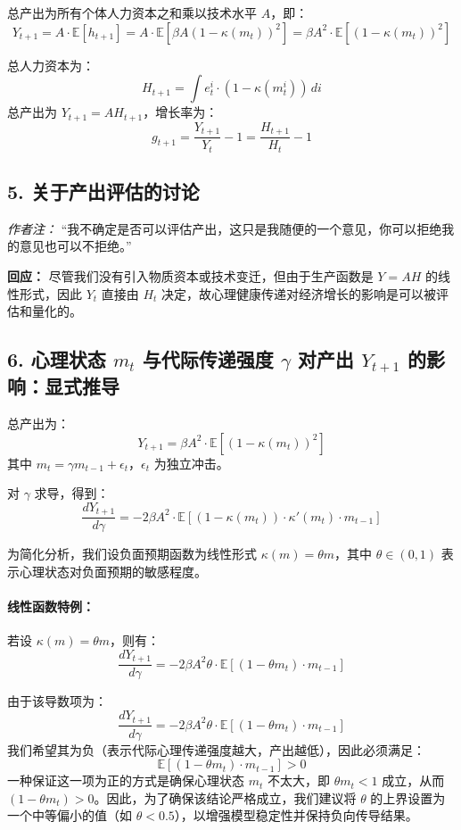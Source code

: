 \documentclass[12pt]{article}
\begin{document}
总产出为所有个体人力资本之和乘以技术水平 $A$，即：
\[
Y_{t+1} = A \cdot \mathbb{E}[h_{t+1}] = A \cdot \mathbb{E}[\beta A (1 - \kappa(m_t))^2] = \beta A^2 \cdot \mathbb{E}[(1 - \kappa(m_t))^2]
\]

总人力资本为：
\[
H_{t+1} = \int e_t^i \cdot (1 - \kappa(m_t^i)) \, di
\]
总产出为 $Y_{t+1} = A H_{t+1}$，增长率为：
\[
g_{t+1} = \frac{Y_{t+1}}{Y_t} - 1 = \frac{H_{t+1}}{H_t} - 1
\]

\subsection*{5. 关于产出评估的讨论}

\textit{作者注：} “我不确定是否可以评估产出，这只是我随便的一个意见，你可以拒绝我的意见也可以不拒绝。”

\textbf{回应：} 尽管我们没有引入物质资本或技术变迁，但由于生产函数是 $Y = A H$ 的线性形式，因此 $Y_t$ 直接由 $H_t$ 决定，故心理健康传递对经济增长的影响是可以被评估和量化的。

\subsection*{6. 心理状态 $m_t$ 与代际传递强度 $\gamma$ 对产出 $Y_{t+1}$ 的影响：显式推导}

总产出为：
\[
Y_{t+1} = \beta A^2 \cdot \mathbb{E}\left[(1 - \kappa(m_t))^2\right]
\]
其中 $m_t = \gamma m_{t-1} + \epsilon_t$，$\epsilon_t$ 为独立冲击。

对 $\gamma$ 求导，得到：
\[
\frac{dY_{t+1}}{d\gamma} = -2 \beta A^2 \cdot \mathbb{E}\left[
(1 - \kappa(m_t)) \cdot \kappa'(m_t) \cdot m_{t-1}
\right]
\]

为简化分析，我们设负面预期函数为线性形式 $\kappa(m) = \theta m$，其中 $\theta \in (0, 1)$ 表示心理状态对负面预期的敏感程度。

\paragraph{线性函数特例：}
若设 $\kappa(m) = \theta m$，则有：
\[
\frac{dY_{t+1}}{d\gamma}
= -2 \beta A^2 \theta \cdot \mathbb{E}[(1 - \theta m_t) \cdot m_{t-1}]
\]

由于该导数项为：
\[
\frac{dY_{t+1}}{d\gamma}
= -2 \beta A^2 \theta \cdot \mathbb{E}[(1 - \theta m_t) \cdot m_{t-1}]
\]
我们希望其为负（表示代际心理传递强度越大，产出越低），因此必须满足：
\[
\mathbb{E}[(1 - \theta m_t) \cdot m_{t-1}] > 0
\]
一种保证这一项为正的方式是确保心理状态 $m_t$ 不太大，即 $\theta m_t < 1$ 成立，从而 $(1 - \theta m_t) > 0$。因此，为了确保该结论严格成立，我们建议将 $\theta$ 的上界设置为一个中等偏小的值（如 $\theta < 0.5$），以增强模型稳定性并保持负向传导结果。
\end{document}
